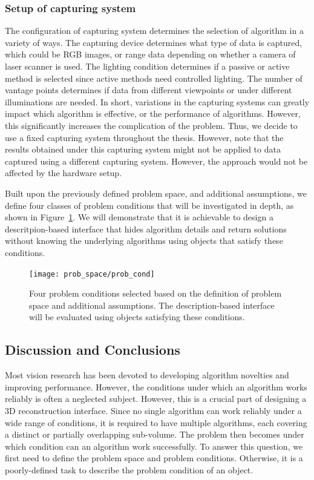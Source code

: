 \subsubsection{Setup of capturing system}
The configuration of capturing system determines the selection of algorithm in a variety of ways. The capturing device determines what type of data is captured, which could be RGB images, or range data depending on whether a camera of laser scanner is used. The lighting condition determines if a passive or active method is selected since active methods need controlled lighting. The number of vantage points determines if data from different viewpoints or under different illuminations are needed. In short, variations in the capturing systems can greatly impact which algorithm is effective, or the performance of algorithms. However, this significantly increases the complication of the problem. Thus, we decide to use a fixed capturing system throughout the thesis. However, note that the results obtained under this capturing system might not be applied to data captured using a different capturing system. However, the approach would not be affected by the hardware setup.

Built upon the previously defined problem space, and additional assumptions, we define four classes of problem conditions that will be investigated in depth, as shown in Figure~\ref{fig:prob_cond}. We will demonstrate that it is achievable to design a descritpion-based interface that hides algorithm details and return solutions without knowing the underlying algorithms using objects that satisfy these conditions.
\begin{figure}[!htbp]
\centering
\texttt{[image: prob\_space/prob\_cond]}
\caption{Four problem conditions selected based on the definition of problem space and additional assumptions. The description-based interface will be evaluated using objects satisfying these conditions.}
\label{fig:prob_cond}
\end{figure}

\subsection{Discussion and Conclusions}
Most vision research has been devoted to developing algorithm novelties and improving performance. However, the conditions under which an algorithm works reliably is often a neglected subject. However, this is a crucial part of designing a 3D reconstruction interface. Since no single algorithm can work reliably under a wide range of conditions, it is required to have multiple algorithms, each covering a distinct or partially overlapping sub-volume. The problem then becomes under which condition can an algorithm work successfully. To answer this question, we first need to define the problem space and problem conditions. Otherwise, it is a poorly-defined task to describe the problem condition of an object.


